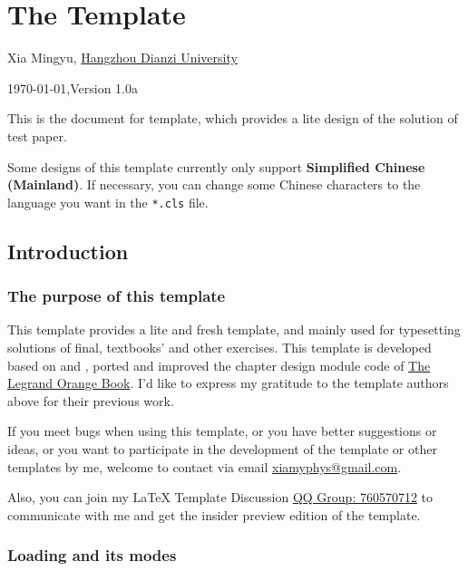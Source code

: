 \chapter{The  Template}
\fancyhead[R]{\color{H7}\rightmark\,}

\centerline{Xia Mingyu, \href{https://www.hdu.edu.cn}{Hangzhou Dianzi University}}
\ddmmyyyydate
\centerline{}
\centerline{\today,\quad Version 1.0a}

This is the document for  template, which provides a lite design of the solution of test paper.

Some designs of this template currently only support \textbf{Simplified Chinese (Mainland)}. If necessary, you can change some Chinese characters to the language you want in the \verb|*.cls| file.

\section{Introduction}
\subsection{The purpose of this template}
This template provides a lite and fresh template, and mainly used for typesetting solutions of final, textbooks' and other exercises. This template is developed based on \href{https://www.ctan.org/pkg/elegantbook}{} and \href{https://github.com/Azure1210/VividBooK}{}, ported and improved the chapter design module code of \href{https://www.overleaf.com/latex/templates/the-legrand-orange-book-template-english/jtctyfmnpppc}{The Legrand Orange Book}. I'd like to express my gratitude to the template authors above for their previous work.

If you meet bugs when using this template, or you have better suggestions or ideas, or you want to participate in the development of the template or other templates by me, welcome to contact via email \href{mailto:xiamyphys@gmail.com}{xiamyphys@gmail.com}.

Also, you can join my \textsf\LaTeX{} Template Discussion \href{https://qm.qq.com/q/OnHzbNvVAG}{QQ Group: 760570712} to communicate with me and get the insider preview edition of the template.

\subsection{Loading  and its modes}

